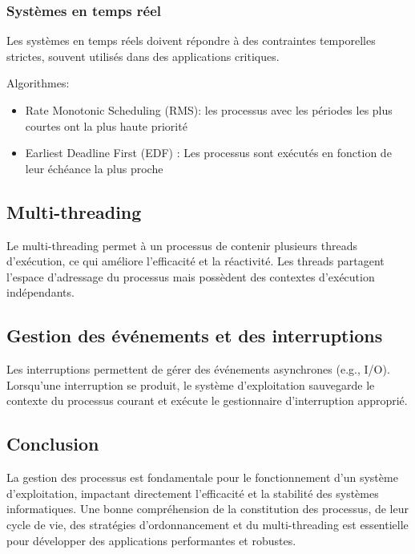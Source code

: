 \subsubsection{Systèmes en temps réel}

Les systèmes en temps réels doivent répondre à des contraintes temporelles strictes, souvent utilisés dans des applications critiques.

Algorithmes:
\begin{itemize}
    \item Rate Monotonic Scheduling (RMS): les processus avec les périodes les plus courtes ont la plus haute priorité
    \item Earliest Deadline First (EDF) : Les processus sont exécutés en fonction de leur échéance la plus proche
\end{itemize}

\subsection{Multi-threading}
Le multi-threading permet à un processus de contenir plusieurs threads d'exécution, ce qui améliore l'efficacité et la réactivité. Les threads partagent l'espace d'adressage du processus mais possèdent des contextes d'exécution indépendants.

\subsection{Gestion des événements et des interruptions}
Les interruptions permettent de gérer des événements asynchrones (e.g., I/O). 
Lorsqu'une interruption se produit, le système d'exploitation sauvegarde le contexte du processus courant et exécute le gestionnaire d'interruption approprié.

\subsection{Conclusion}
La gestion des processus est fondamentale pour le fonctionnement d'un système d'exploitation, impactant directement l'efficacité et la stabilité des systèmes informatiques. 
Une bonne compréhension de la constitution des processus, de leur cycle de vie, des stratégies d'ordonnancement et du multi-threading est essentielle pour développer des applications performantes et robustes.
